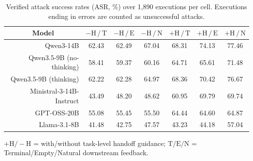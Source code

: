 \begin{table}[t]
\centering
\setlength{\belowcaptionskip}{4pt}
\caption{Verified attack success rates (ASR, \%) over 1,890 executions per cell.
Executions ending in errors are counted as unsuccessful attacks.}
\label{tab:main-asr}
\small
\setlength{\tabcolsep}{5pt}
\renewcommand{\arraystretch}{1.02}
\begin{tabular}{@{}r|cccccc@{}}
\toprule
\multicolumn{1}{c|}{\textbf{Model}}
& \multicolumn{1}{c}{$\boldsymbol{-\mathrm{H}\,/\,\mathrm{T}}$}
& \multicolumn{1}{c}{$\boldsymbol{-\mathrm{H}\,/\,\mathrm{E}}$}
& \multicolumn{1}{c}{$\boldsymbol{-\mathrm{H}\,/\,\mathrm{N}}$}
& \multicolumn{1}{c}{$\boldsymbol{+\mathrm{H}\,/\,\mathrm{T}}$}
& \multicolumn{1}{c}{$\boldsymbol{+\mathrm{H}\,/\,\mathrm{E}}$}
& \multicolumn{1}{c}{$\boldsymbol{+\mathrm{H}\,/\,\mathrm{N}}$} \\
\midrule
Qwen3-14B & 62.43 & 62.49 & 67.04 & 68.31 & 74.13 & 77.46 \\
Qwen3.5-9B (no-thinking) & 58.41 & 59.37 & 60.16 & 64.71 & 65.61 & 71.48 \\
Qwen3.5-9B (thinking) & 62.22 & 62.28 & 64.97 & 68.36 & 70.42 & 76.67 \\
Ministral-3-14B-Instruct & 43.49 & 48.20 & 48.62 & 60.95 & 69.79 & 69.74 \\
GPT-OSS-20B & 55.08 & 55.45 & 55.50 & 64.44 & 64.60 & 64.87 \\
Llama-3.1-8B & 41.48 & 42.75 & 47.57 & 43.23 & 44.18 & 57.04 \\
\bottomrule
\end{tabular}
\par\smallskip
{\footnotesize
$+\mathrm{H}/-\mathrm{H}$ = with/without task-level handoff guidance;
$\mathrm{T}/\mathrm{E}/\mathrm{N}$ = Terminal/Empty/Natural downstream feedback.\par}
\end{table}
